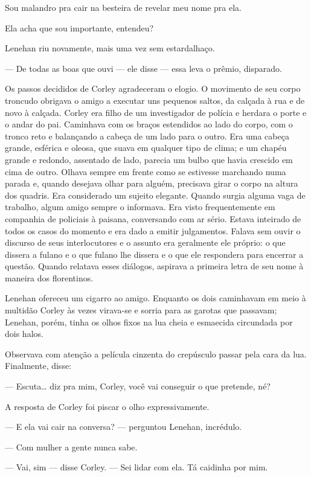Sou malandro pra cair na besteira de revelar meu nome pra ela.

Ela acha que sou importante, entendeu?

Lenehan riu novamente, mais uma vez sem estardalhaço.

--- De todas as boas que ouvi --- ele disse --- essa leva o prêmio,
disparado.

Os passos decididos de Corley agradeceram o elogio. O movimento de
seu corpo troncudo obrigava o amigo a executar uns pequenos saltos, da
calçada à rua e de novo à calçada. Corley era filho de um investigador
de polícia e herdara o porte e o andar do pai. Caminhava com os braços
estendidos ao lado do corpo, com o tronco reto e balançando a cabeça
de um lado para o outro. Era uma cabeça grande, esférica e oleosa, que
suava em qualquer tipo de clima; e um chapéu grande e redondo,
assentado de lado, parecia um bulbo que havia crescido em cima de
outro. Olhava sempre em frente como se estivesse marchando numa parada
e, quando desejava olhar para alguém, precisava girar o corpo na
altura dos quadris. Era considerado um sujeito elegante. Quando surgia
alguma vaga de trabalho, algum amigo sempre o informava. Era visto
frequentemente em companhia de policiais à paisana, conversando com
ar sério. Estava inteirado de todos os casos do momento e era dado a
emitir julgamentos. Falava sem ouvir o discurso de seus interlocutores
e o assunto era geralmente ele próprio: o que dissera a fulano e o que
fulano lhe dissera e o que ele respondera para encerrar a questão.
Quando relatava esses diálogos, aspirava a primeira letra de seu nome
à maneira dos florentinos.

Lenehan ofereceu um cigarro ao amigo. Enquanto os dois caminhavam em
meio à multidão Corley às vezes virava-se e sorria para as garotas que
passavam; Lenehan, porém, tinha os olhos fixos na lua cheia e
esmaecida circundada por dois halos.

Observava com atenção a película cinzenta do crepúsculo passar pela
cara da lua. Finalmente, disse:

--- Escuta\ldots{} diz pra mim, Corley, você vai conseguir o que pretende,
né?

A resposta de Corley foi piscar o olho expressivamente.

--- E ela vai cair na conversa? --- perguntou Lenehan, incrédulo.

--- Com mulher a gente nunca sabe.

--- Vai, sim --- disse Corley. --- Sei lidar com ela. Tá caidinha por
mim.

